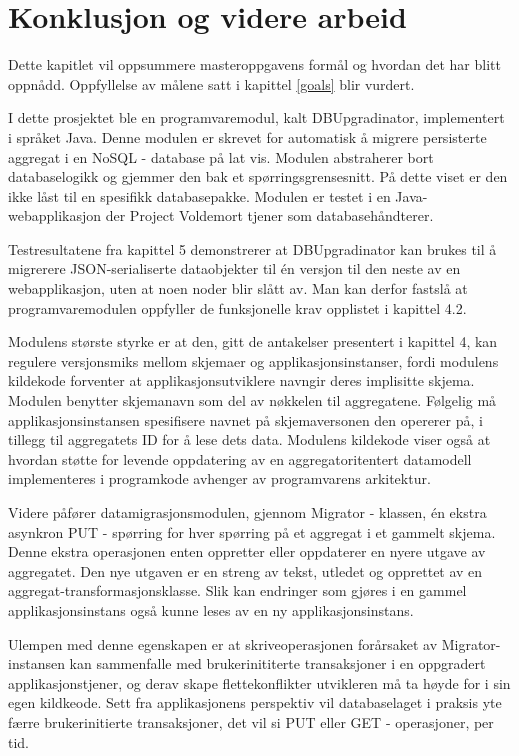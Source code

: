 
\chapter{Konklusjon og videre arbeid}

Dette kapitlet vil oppsummere masteroppgavens formål og hvordan det har blitt oppnådd. Oppfyllelse av målene satt i kapittel \ref{goals} blir vurdert.

I dette prosjektet ble en programvaremodul, kalt DBUpgradinator, implementert i språket Java. Denne modulen er skrevet for automatisk å migrere persisterte aggregat i en NoSQL - database på lat vis. Modulen abstraherer bort databaselogikk og gjemmer den bak et spørringsgrensesnitt. På dette viset er den ikke låst til en spesifikk databasepakke. Modulen er testet i en Java-webapplikasjon der Project Voldemort tjener som databasehåndterer.

Testresultatene fra kapittel 5 demonstrerer at DBUpgradinator kan brukes til å migrerere JSON-serialiserte dataobjekter til én versjon til den neste av en webapplikasjon, uten at noen noder blir slått av. Man kan derfor fastslå at programvaremodulen oppfyller de funksjonelle krav opplistet i kapittel 4.2.

Modulens største styrke er at den, gitt de antakelser presentert i kapittel 4, kan regulere versjonsmiks mellom skjemaer og applikasjonsinstanser, fordi modulens kildekode forventer at applikasjonsutviklere navngir deres implisitte skjema. Modulen benytter skjemanavn som del av nøkkelen til aggregatene. Følgelig må applikasjonsinstansen spesifisere navnet på skjemaversonen den opererer på, i tillegg til aggregatets ID for å lese dets data. Modulens kildekode viser også at hvordan støtte for levende oppdatering av en aggregatoritentert datamodell implementeres i programkode avhenger av programvarens arkitektur.

Videre påfører datamigrasjonsmodulen, gjennom Migrator - klassen, én ekstra asynkron PUT - spørring for hver spørring på et aggregat i et gammelt skjema. Denne ekstra operasjonen enten oppretter eller oppdaterer en nyere utgave av aggregatet. Den nye utgaven er en streng av tekst, utledet og opprettet av en aggregat-transformasjonsklasse. Slik kan endringer som gjøres i en gammel applikasjonsinstans også kunne leses av en ny applikasjonsinstans.

Ulempen med denne egenskapen er at skriveoperasjonen forårsaket av Migrator-instansen kan sammenfalle med brukerinititerte transaksjoner i en oppgradert applikasjonstjener, og derav skape flettekonflikter utvikleren må ta høyde for i sin egen kildkeode. Sett fra applikasjonens perspektiv vil databaselaget i praksis yte færre brukerinitierte transaksjoner, det vil si PUT eller GET - operasjoner, per tid.

